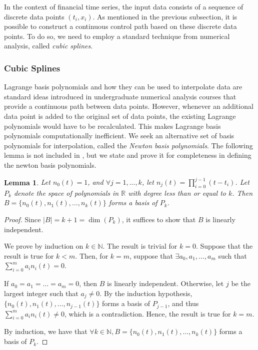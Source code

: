 \documentclass[a4paper,11pt,titlepage]{article}
\theoremstyle{definition}
\theoremstyle{plain}
\newtheorem{lemma}[theorem]{Lemma}
\theoremstyle{remark}
\begin{document}
In the context of financial time series, the input data consists of a sequence of discrete data points $\left(t_i,x_i\right)$. As mentioned in the previous subsection, it is possible to construct a continuous control path based on these discrete data points. To do so, we need to employ a standard technique from numerical analysis, called \textit{cubic splines}. 

\subsubsection{Cubic Splines}

Lagrange basis polynomials and how they can be used to interpolate data are standard ideas introduced in undergraduate numerical analysis courses that provide a continuous path between data points. However, whenever an additional data point is added to the original set of data points, the existing Lagrange polynomials would have to be recalculated. This makes Lagrange basis polynomials computationally inefficient. We seek an alternative set of basis polynomials for interpolation, called the \textit{Newton basis polynomials}. The following lemma is not included in \cite{Gautschi2012}, but we state and prove it for completeness in defining the newton basis polynomials.

\begin{lemma}
    Let $n_0(t)=1$, and $\forall j=1,...,k$, let $n_j(t)=\prod_{i=0}^{j-1}(t-t_i)$. Let $P_k$ denote the space of polynomials in $\mathbb{R}$ with  degree less than or equal to $k$. Then $B=\{n_0(t),n_1(t),...,n_k(t)\}$ forms a basis of $P_k$.
\end{lemma}

\begin{proof}
    Since $|B|=k+1=\dim(P_k)$, it suffices to show that $B$ is linearly independent.
    
    We prove by induction on $k\in\mathbb{N}$. The result is trivial for $k=0$. Suppose that the result is true for $k<m$. Then, for $k=m$, suppose that $\exists a_0,a_1,\dots,a_m$ such that $\sum_{i=0}^ma_in_i(t)=0$.

    If $a_0=a_1=\dots=a_m=0$, then $B$ is linearly independent. Otherwise, let $j$ be the largest integer such that $a_j\neq0$. By the induction hypothesis, $\{n_0(t),n_1(t),\dots,n_{j-1}(t)\}$ forms a basis of $P_{j-1}$, and thus $\sum_{i=0}^ma_in_i(t)\neq0$, which is a contradiction. Hence, the result is true for $k=m$.

    By induction, we have that $\forall k\in\mathbb{N}, B=\{n_0(t),n_1(t),\dots,n_k(t)\}$ forms a basis of $P_k$.
\end{proof}
\end{document}
